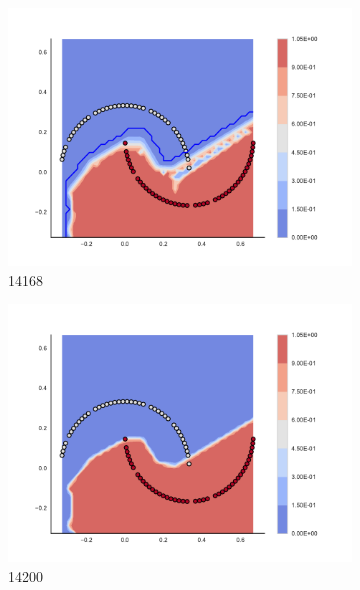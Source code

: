\begin{figure}[h]
\begin{subfigure}[b]{0.09\textwidth}
    \includegraphics[clip, trim=2.35cm 1.75cm 4.5cm 0cm,width=\textwidth]{img/convergence/14168.pdf}
    \caption{14168}
    \label{fig:convergence_14168}
\end{subfigure}
%
\begin{subfigure}[b]{0.09\textwidth}
    \includegraphics[clip, trim=2.35cm 1.75cm 4.5cm 0cm,width=\textwidth]{img/convergence/14200.pdf}
    \caption{14200}
    \label{fig:convergence_14200}
\end{subfigure}
%
\begin{subfigure}[b]{0.09\textwidth}

\end{subfigure}
\end{figure}
